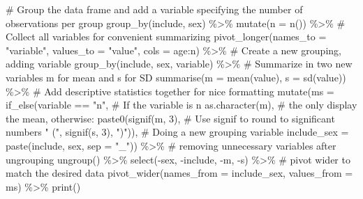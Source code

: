 \documentclass[
  11pt,
  letterpaper,
]{scrbook}
\newenvironment{Shaded}{\begin{snugshade}}{\end{snugshade}}
\newcommand{\AttributeTok}[1]{\textcolor[rgb]{0.40,0.45,0.13}{#1}}
\newcommand{\CommentTok}[1]{\textcolor[rgb]{0.37,0.37,0.37}{#1}}
\newcommand{\DecValTok}[1]{\textcolor[rgb]{0.68,0.00,0.00}{#1}}
\newcommand{\FunctionTok}[1]{\textcolor[rgb]{0.28,0.35,0.67}{#1}}
\newcommand{\NormalTok}[1]{\textcolor[rgb]{0.00,0.23,0.31}{#1}}
\newcommand{\SpecialCharTok}[1]{\textcolor[rgb]{0.37,0.37,0.37}{#1}}
\newcommand{\StringTok}[1]{\textcolor[rgb]{0.13,0.47,0.30}{#1}}
\begin{document}
\begin{Shaded}
\begin{Highlighting}[numbers=left,,]
  \CommentTok{\# Group the data frame and add a variable specifying the number of observations per group}
  \FunctionTok{group\_by}\NormalTok{(include, sex) }\SpecialCharTok{\%\textgreater{}\%}
  \FunctionTok{mutate}\NormalTok{(}\AttributeTok{n =} \FunctionTok{n}\NormalTok{()) }\SpecialCharTok{\%\textgreater{}\%}
  \CommentTok{\# Collect all variables for convenient summarizing}
  \FunctionTok{pivot\_longer}\NormalTok{(}\AttributeTok{names\_to =} \StringTok{"variable"}\NormalTok{, }
               \AttributeTok{values\_to =} \StringTok{"value"}\NormalTok{, }
               \AttributeTok{cols =}\NormalTok{ age}\SpecialCharTok{:}\NormalTok{n) }\SpecialCharTok{\%\textgreater{}\%}
  \CommentTok{\# Create a new grouping, adding variable}
  \FunctionTok{group\_by}\NormalTok{(include, sex, variable) }\SpecialCharTok{\%\textgreater{}\%}
  \CommentTok{\# Summarize in two new variables m for mean and s for SD}
  \FunctionTok{summarise}\NormalTok{(}\AttributeTok{m =} \FunctionTok{mean}\NormalTok{(value), }
            \AttributeTok{s =} \FunctionTok{sd}\NormalTok{(value)) }\SpecialCharTok{\%\textgreater{}\%}
  \CommentTok{\# Add descriptive statistics together for nice formatting}
  \FunctionTok{mutate}\NormalTok{(}\AttributeTok{ms =} \FunctionTok{if\_else}\NormalTok{(variable }\SpecialCharTok{==} \StringTok{"n"}\NormalTok{, }\CommentTok{\# If the variable is n}
                      \FunctionTok{as.character}\NormalTok{(m), }\CommentTok{\# the only display the mean, otherwise:}
                        \FunctionTok{paste0}\NormalTok{(}\FunctionTok{signif}\NormalTok{(m, }\DecValTok{3}\NormalTok{), }\CommentTok{\# Use signif to round to significant numbers}
                        \StringTok{" ("}\NormalTok{,}
                        \FunctionTok{signif}\NormalTok{(s, }\DecValTok{3}\NormalTok{), }
                        \StringTok{")"}\NormalTok{)), }
         \CommentTok{\# Doing a new grouping variable}
         \AttributeTok{include\_sex =} \FunctionTok{paste}\NormalTok{(include, sex, }\AttributeTok{sep =} \StringTok{"\_"}\NormalTok{)) }\SpecialCharTok{\%\textgreater{}\%}
  \CommentTok{\# removing unnecessary variables after ungrouping}
  \FunctionTok{ungroup}\NormalTok{() }\SpecialCharTok{\%\textgreater{}\%}
  \FunctionTok{select}\NormalTok{(}\SpecialCharTok{{-}}\NormalTok{sex, }\SpecialCharTok{{-}}\NormalTok{include, }\SpecialCharTok{{-}}\NormalTok{m, }\SpecialCharTok{{-}}\NormalTok{s) }\SpecialCharTok{\%\textgreater{}\%}
  \CommentTok{\# pivot wider to match the desired data}
  \FunctionTok{pivot\_wider}\NormalTok{(}\AttributeTok{names\_from =}\NormalTok{ include\_sex, }
              \AttributeTok{values\_from =}\NormalTok{ ms) }\SpecialCharTok{\%\textgreater{}\%}
  \FunctionTok{print}\NormalTok{()}
\end{Highlighting}
\end{Shaded}
\end{document}
